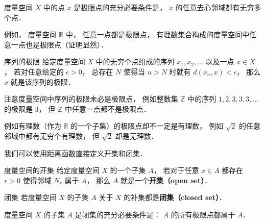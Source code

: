 \begin{corollary}{}
度量空间 $X$ 中的点 $x$ 是极限点的充分必要条件是， $x$ 的任意去心邻域都有无穷多个点．
\end{corollary}

例如， 度量空间 $\mathbb R$ 中， 任意一点都是极限点， 有理数集合构成的度量空间中任意一点也是极限点（证明显然）．

\begin{definition}{序列的极限}
给定度量空间 $X$ 中的无穷个点组成的序列 $x_1, x_2, \dots$ 以及一点 $x \in X$， 若对任意给定的 $\epsilon > 0$， 总存在 $N$ 使得当 $n > N$ 时就有 $d(x_n, x) < \epsilon$， 那么 $x$ 就是该序列的极限．
\end{definition}
注意度量空间中序列的极限未必是极限点， 例如整数集 $\mathbb Z$ 中的序列 $1, 2, 3, 3, 3, \dots$ 的极限是 $3$， 但 $\mathbb Z$ 中任意一点都不是极限点．

例如有理数（作为 $\mathbb R$ 的一个子集）的极限点却不一定是有理数， 例如 $\sqrt{2}$ 的任意邻域中都有无穷个有理数， 但 $\sqrt{2}$ 却是无理数．

我们可以使用距离函数直接定义开集和闭集．
\begin{definition}{度量空间的开集}
给定度量空间 $X$ 的一个子集 $A$， 若对于任意 $x \in A$ 都存在 $r > 0$ 使得邻域 $N_r$ 属于 $A$， 那么 $A$ 就是一个\textbf{开集（open set）}．
\end{definition}

\begin{definition}{闭集}
若度量空间 $X$ 的子集 $A$ 关于 $X$ 的补集都是\textbf{闭集（closed set）}．
\end{definition}

\begin{theorem}{}
度量空间 $X$ 的子集 $A$ 是闭集的充分必要条件是： $A$ 的所有极限点都属于 $A$．
\end{theorem}
